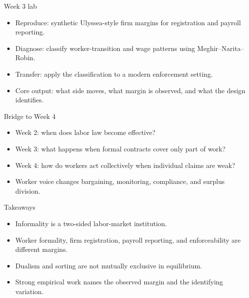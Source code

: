 \documentclass[aspectratio=169,11pt]{beamer}
\begin{document}
\begin{frame}{Week 3 lab}
\begin{itemize}
    \item Reproduce: synthetic Ulyssea-style firm margins for registration and payroll reporting.
    \item Diagnose: classify worker-transition and wage patterns using Meghir--Narita--Robin.
    \item Transfer: apply the classification to a modern enforcement setting.
    \item Core output: what side moves, what margin is observed, and what the design identifies.
\end{itemize}
\end{frame}

\begin{frame}{Bridge to Week 4}
\begin{itemize}
    \item Week 2: when does labor law become effective?
    \item Week 3: what happens when formal contracts cover only part of work?
    \item Week 4: how do workers act collectively when individual claims are weak?
    \item Worker voice changes bargaining, monitoring, compliance, and surplus division.
\end{itemize}
\end{frame}

\begin{frame}{Takeaways}
\begin{itemize}
    \item Informality is a two-sided labor-market institution.
    \item Worker formality, firm registration, payroll reporting, and enforceability are different margins.
    \item Dualism and sorting are not mutually exclusive in equilibrium.
    \item Strong empirical work names the observed margin and the identifying variation.
\end{itemize}
\end{frame}
\end{document}
